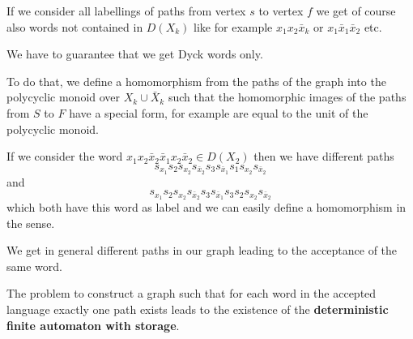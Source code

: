 If we consider all labellings of paths from vertex $s$ to vertex $f$ we get of
course also words not contained in $D(X_k)$ like for example $x_1 x_2
\bar{x}_k$ or $x_1 \bar{x}_1 \bar{x}_2$ etc.

We have to guarantee that we get Dyck words only. 

To do that, we define a homomorphism from the paths of the graph into the
polycyclic monoid over $X_k \cup \bar{X}_k$ such that the homomorphic images of the paths 
from $S$ to $F$ have a special form, for example are equal to the unit of the
polycyclic monoid.

If we consider the word $ x_1 x_2 \bar{x}_2 \bar{x}_1 x_2 \bar{x}_2 \in D(X_2)$
then we have different paths 
\[s_{x_1} s_2 s_{x_2} s_{\bar{x}_2} s_3 s_{\bar{x}_1} s_1 s_{x_2} s_{\bar{x}_2} \] 
and 
\[s_{x_1} s_2 s_{x_2} s_{\bar{x}_2} s_3 s_{\bar{x}_1} s_3 s_2 s_{x_2}
s_{\bar{x}_2}\] 
which both have this word as label and we can easily define a homomorphism in
the sense.

We get in general different paths in our graph leading to the acceptance of the
same word.

The problem to construct a graph such that for each word in the accepted
language exactly one path exists leads to the existence of the {\bf
deterministic finite automaton with storage}.

